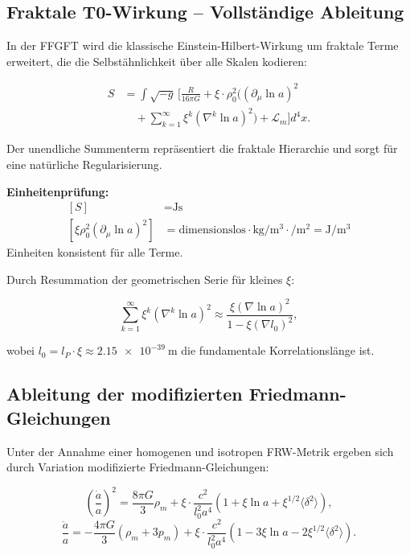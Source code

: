 	\subsection*{Fraktale T0-Wirkung – Vollständige Ableitung}
	
	In der FFGFT wird die klassische Einstein-Hilbert-Wirkung um fraktale Terme erweitert, die die Selbstähnlichkeit über alle Skalen kodieren:
	
\begin{equation}
	\begin{aligned}
		S &= \int \sqrt{-g} \, \Biggl[ \frac{R}{16\pi G} 
		+ \xi \cdot \rho_0^2 \Biggl( (\partial_\mu \ln a)^2 \\
		&\quad + \sum_{k=1}^\infty \xi^k (\nabla^k \ln a)^2 \Biggr) 
		+ \mathcal{L}_m \Biggr] d^4x.
	\end{aligned}
\end{equation}
	
	Der unendliche Summenterm repräsentiert die fraktale Hierarchie und sorgt für eine natürliche Regularisierung.
	
	\textbf{Einheitenprüfung:}
	\[
	\begin{aligned}
		[S] &= \si{\joule \second} \\
		[\xi \rho_0^2 (\partial_\mu \ln a)^2] &= \text{dimensionslos} \cdot \si{\kilo\gram\per\meter\cubed} \cdot \si{\per\meter\squared} = \si{\joule\per\meter\cubed}
	\end{aligned}
	\]
	Einheiten konsistent für alle Terme.
	
	Durch Resummation der geometrischen Serie für kleines \(\xi\):
	
	\begin{equation}
		\sum_{k=1}^\infty \xi^k (\nabla^k \ln a)^2 \approx \frac{\xi (\nabla \ln a)^2}{1 - \xi (\nabla l_0)^2},
	\end{equation}
	
	wobei \(l_0 = l_P \cdot \xi \approx \SI{2.15e-39}{\meter}\) die fundamentale Korrelationslänge ist.
	
	\subsection*{Ableitung der modifizierten Friedmann-Gleichungen}
	
	Unter der Annahme einer homogenen und isotropen FRW-Metrik ergeben sich durch Variation modifizierte Friedmann-Gleichungen:
	
	\begin{equation}
		\left( \frac{\dot{a}}{a} \right)^2 = \frac{8\pi G}{3} \rho_m + \xi \cdot \frac{c^2}{l_0^2 a^4} \left( 1 + \xi \ln a + \xi^{1/2} \langle \delta^2 \rangle \right),
	\end{equation}
	\begin{equation}
		\frac{\ddot{a}}{a} = -\frac{4\pi G}{3} (\rho_m + 3p_m) + \xi \cdot \frac{c^2}{l_0^2 a^4} \left( 1 - 3\xi \ln a - 2\xi^{1/2} \langle \delta^2 \rangle \right).
	\end{equation}
	
